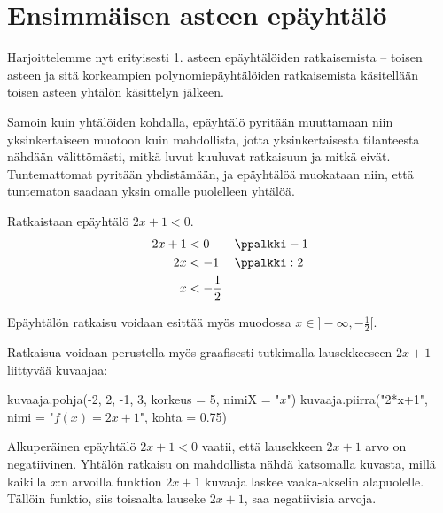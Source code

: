 \section{Ensimmäisen asteen epäyhtälö}


Harjoittelemme nyt erityisesti 1. asteen epäyhtälöiden ratkaisemista -- toisen asteen ja sitä korkeampien polynomiepäyhtälöiden ratkaisemista käsitellään toisen asteen yhtälön käsittelyn jälkeen.

Samoin kuin yhtälöiden kohdalla, epäyhtälö pyritään muuttamaan niin yksinkertaiseen muotoon kuin mahdollista, jotta yksinkertaisesta tilanteesta nähdään välittömästi, mitkä luvut kuuluvat ratkaisuun ja mitkä eivät. Tuntemattomat pyritään yhdistämään, ja epäyhtälöä muokataan niin, että tuntematon saadaan yksin omalle puolelleen yhtälöä.


\begin{esimerkki}
Ratkaistaan epäyhtälö $2x+1 < 0$.
\begin{align*}
2x+1 &< 0 && \ppalkki -1 \\
2x &< -1 && \ppalkki :2 \\
x &< -\frac{1}{2}
\end{align*}

Epäyhtälön ratkaisu voidaan esittää myös muodossa $x \in ]-\infty, -\frac{1}{2}[$.

Ratkaisua voidaan perustella myös graafisesti tutkimalla lausekkeeseen $2x+1$ liittyvää kuvaajaa:

\begin{kuva}
kuvaaja.pohja(-2, 2, -1, 3, korkeus = 5, nimiX = "$x$")
kuvaaja.piirra("2*x+1", nimi = "$f(x) = 2x + 1$", kohta = 0.75)
\end{kuva}

Alkuperäinen epäyhtälö $2x+1<0$ vaatii, että lausekkeen $2x+1$ arvo on negatiivinen. Yhtälön ratkaisu on mahdollista nähdä katsomalla kuvasta, millä kaikilla $x$:n arvoilla funktion $2x+1$ kuvaaja laskee vaaka-akselin alapuolelle. Tällöin funktio, siis toisaalta lauseke $2x+1$, saa negatiivisia arvoja.

\end{esimerkki}


